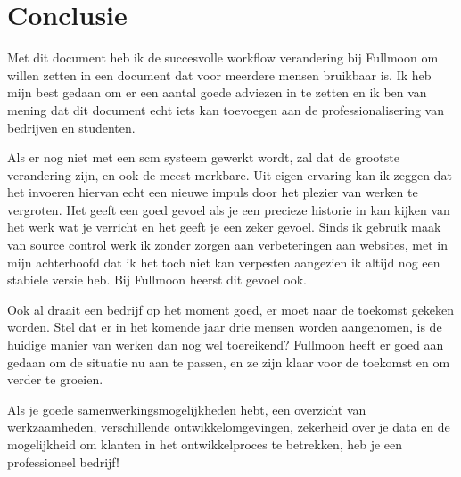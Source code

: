 \chapter{Conclusie}

Met dit document heb ik de succesvolle workflow verandering bij Fullmoon om willen zetten in een document dat voor meerdere mensen bruikbaar is. Ik heb mijn best gedaan om er een aantal goede adviezen in te zetten en ik ben van mening dat dit document echt iets kan toevoegen aan de professionalisering van bedrijven en studenten.

Als er nog niet met een {\sc scm} systeem gewerkt wordt, zal dat de grootste verandering zijn, en ook de meest merkbare. Uit eigen ervaring kan ik zeggen dat het invoeren hiervan echt een nieuwe impuls door het plezier van werken te vergroten. Het geeft een goed gevoel als je een precieze historie in kan kijken van het werk wat je verricht en het geeft je een zeker gevoel. Sinds ik gebruik maak van source control werk ik zonder zorgen aan verbeteringen aan websites, met in mijn achterhoofd dat ik het toch niet kan verpesten aangezien ik altijd nog een stabiele versie heb. Bij Fullmoon heerst dit gevoel ook.

Ook al draait een bedrijf op het moment goed, er moet naar de toekomst gekeken worden. Stel dat er in het komende jaar drie mensen worden aangenomen, is de huidige manier van werken dan nog wel toereikend? Fullmoon heeft er goed aan gedaan om de situatie nu aan te passen, en ze zijn klaar voor de toekomst en om verder te groeien.

Als je goede samenwerkingsmogelijkheden hebt, een overzicht van werkzaamheden, verschillende ontwikkelomgevingen, zekerheid over je data en de mogelijkheid om klanten in het ontwikkelproces te betrekken, heb je een professioneel bedrijf!
